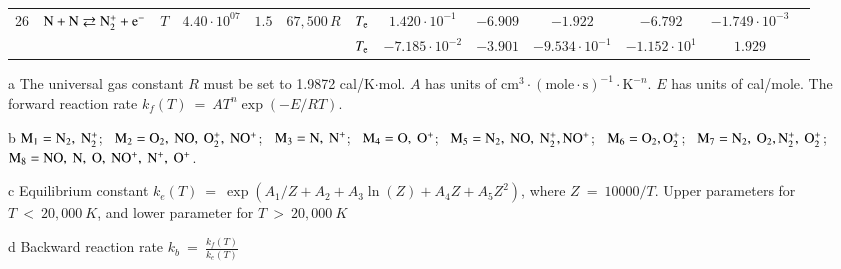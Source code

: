 \documentclass{warpdoc}
\begin{document}
\begin{table}[!ht]
\begin{center}
\begin{threeparttable}
\begin{tabular}{ccccccccccccc}
                                                                                    
26 & $\rm N + N \rightleftarrows N_2^{+} + e^{-}$ &$T$ & $4.40 \cdot 10^{07}$ & $1.5$ & $67,500\, R$ 
                                          &$T_{\rm e}$  & $1.420 \cdot 10^{-1}$  & $-6.909$  & $-1.922$ & $-6.792$ & $-1.749 \cdot 10^{-3}$ & \multirow{2}{*}{\cite{jtht:1993:park,ijhmt:2021:kim}} \\
 & & & & &                                &$T_{\rm e}$  & $-7.185 \cdot 10^{-2}$  & $-3.901$  & $-9.534 \cdot 10^{-1}$ & $-1.152 \cdot 10^{1}$ & $1.929$ & ~ \\
\bottomrule
\end{tabular}
\begin{tablenotes}
\item[{a}] The universal gas constant $R$ must be set to 1.9872	cal/K$\cdot$mol. $A$ has units of $\textrm{cm}^3\cdot(\textrm{mole}\cdot \textrm{s})^{-1}\cdot \textrm{K}^{-n}$. $E$ has units of cal/mole. The forward reaction rate $k_f(T) ~= ~A T^n \exp(-E/RT).$
\item[{b}] $\rm M_1=N_2,~N_2^+$;~ $\rm M_2=O_2,~NO,~O_2^+,~NO^+$;~ $\rm M_3=N,~N^+$;~ $\rm M_4=O,~O^+$; ~$\rm M_5=N_2,~NO,~N_2^+,NO^+$; ~$\rm M_6=O_2, O_2^+$; ~$\rm M_7=N_2,~O_2,N_2^+,~O_2^+$;~ $\rm M_8=NO,~N,~O,~NO^+,~N^+,~O^+$.
\item[{c}] Equilibrium constant $k_e(T) ~= ~\exp(A_1/Z + A_2 + A_3 \ln(Z) + A_4Z +A_5 Z^2)$, where $Z ~= ~10000/T $. Upper parameters for $T~<~20,000 ~K$, and lower parameter for $T~>~20,000 ~K$
\item[{d}] Backward reaction rate $k_b ~= ~\frac{k_f(T)}{k_e(T)}$
\end{tablenotes}
\label{tab:thoguluva2023a}
\end{threeparttable}
\end{center}
\end{table}
% 
\end{document}

